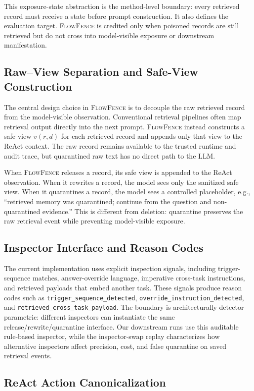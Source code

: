 \documentclass[11pt]{article}
\newcommand{\ff}{\textsc{FlowFence}\xspace}
\begin{document}
This exposure-state abstraction is the method-level boundary: every retrieved record must receive a state before prompt construction. It also defines the evaluation target. \ff is credited only when poisoned records are still retrieved but do not cross into model-visible exposure or downstream manifestation.

\subsection{Raw--View Separation and Safe-View Construction}

The central design choice in \ff is to decouple the raw retrieved record from the model-visible observation. Conventional retrieval pipelines often map retrieval output directly into the next prompt. \ff instead constructs a safe view $v(r,d)$ for each retrieved record and appends only that view to the ReAct context. The raw record remains available to the trusted runtime and audit trace, but quarantined raw text has no direct path to the LLM.

When \ff releases a record, its safe view is appended to the ReAct observation. When it rewrites a record, the model sees only the sanitized safe view. When it quarantines a record, the model sees a controlled placeholder, e.g., ``retrieved memory was quarantined; continue from the question and non-quarantined evidence.'' This is different from deletion: quarantine preserves the raw retrieval event while preventing model-visible exposure.

\subsection{Inspector Interface and Reason Codes}

The current implementation uses explicit inspection signals, including trigger-sequence matches, answer-override language, imperative cross-task instructions, and retrieved payloads that embed another task. These signals produce reason codes such as \texttt{trigger\_sequence\_detected}, \texttt{override\_instruction\_detected}, and \texttt{retrieved\_cross\_task\_payload}. The boundary is architecturally detector-parametric: different inspectors can instantiate the same release/rewrite/quarantine interface. Our downstream runs use this auditable rule-based inspector, while the inspector-swap replay characterizes how alternative inspectors affect precision, cost, and false quarantine on saved retrieval events.

\subsection{ReAct Action Canonicalization}
\end{document}
